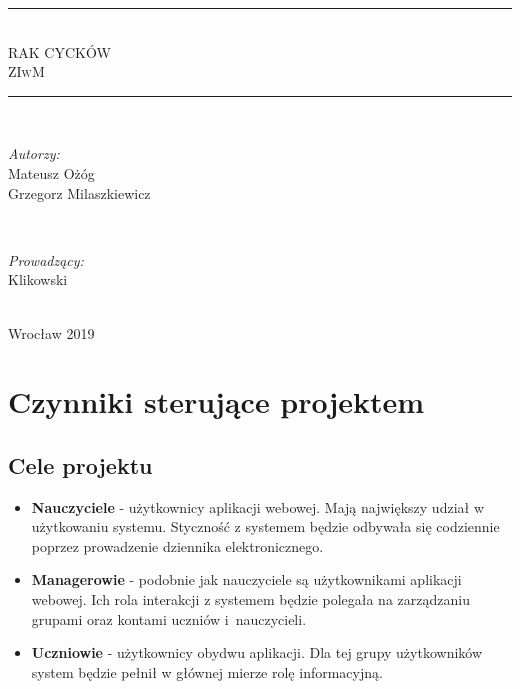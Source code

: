 \documentclass[12pt]{article}
\begin{document}
\begin{titlepage}
\newcommand{\LINE}{\rule{\linewidth}{0.7mm}}
\center
\LINE \\[0.5cm]
\Huge\textsc{RAK CYCKÓW}\\ [5mm]
\normalsize\textsc{ZIwM}  \\[0.5cm]
\LINE \\[3cm]
\begin{minipage}{0.5\textwidth}
\begin{flushleft} \large
\emph{Autorzy:}
		\\Mateusz Ożóg %
		\\Grzegorz Milaszkiewicz %
\end{flushleft}
\end{minipage}
~
\begin{minipage}{0.45\textwidth}
\begin{flushright} \large
\emph{Prowadzący:} \\
Klikowski
\end{flushright}
\end{minipage}\\[2cm]
\vfill
\center Wrocław 2019
\end{titlepage}

\renewcommand{\contentsname}{Spis treści}
\tableofcontents
\newpage

\section{Czynniki sterujące projektem}
\subsection{Cele projektu} 


\begin{itemize}
\item \textbf{Nauczyciele} - użytkownicy aplikacji webowej. Mają największy udział w użytkowaniu systemu. Styczność z systemem będzie odbywała się codziennie poprzez prowadzenie dziennika elektronicznego. 
\item \textbf{Managerowie} - podobnie jak nauczyciele są użytkownikami aplikacji webowej. Ich rola interakcji z systemem będzie polegała na zarządzaniu grupami oraz kontami uczniów i~nauczycieli.
\item \textbf{Uczniowie} - użytkownicy obydwu aplikacji. Dla tej grupy użytkowników system będzie pełnił w głównej mierze rolę informacyjną.
\end{itemize}
\end{document}
